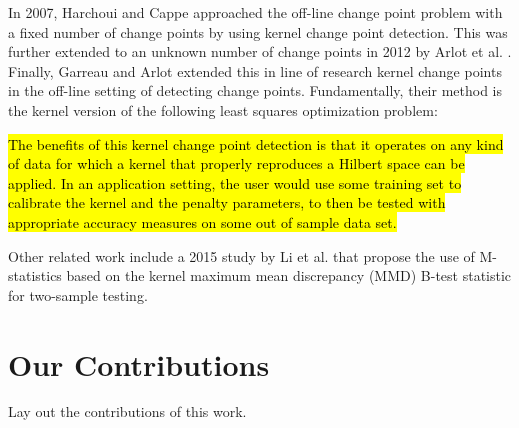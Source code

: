 In 2007, Harchoui and Cappe \cite{harchaoui2007retrospective} approached the off-line change point problem with a fixed number of change points by using kernel change point detection. This was further extended to an unknown number of change points in 2012 by Arlot et al. \cite{arlot2012kernel}. Finally, Garreau and Arlot extended this in line of research kernel change points in the off-line setting of detecting change points. Fundamentally, their method is the kernel version of the following least squares optimization problem:


\hl{The benefits of this kernel change point detection is that it operates on any kind of data for which a kernel that properly reproduces a Hilbert space can be applied.  %
In an application setting, the user would use some training set to calibrate the kernel and the penalty parameters, to then be tested with appropriate accuracy measures on some out of sample data set.}


Other related work include a 2015 study by Li et al. \cite{li2015m} that propose the use of M-statistics based on the kernel maximum mean discrepancy (MMD) B-test statistic for two-sample testing.





 

\section{Our Contributions}
Lay out the contributions of this work.